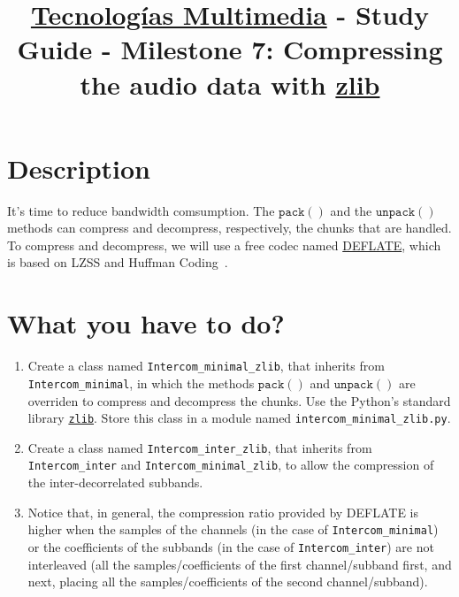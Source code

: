 \title{\href{https://www.ual.es/estudios/grados/presentacion/plandeestudios/asignatura/4015/40154321?idioma=zh_CN}{Tecnologías Multimedia} - Study Guide - Milestone 7: Compressing the audio data with \href{https://zlib.net/}{zlib}}

\maketitle

\section{Description}

It's time to reduce bandwidth comsumption. The $\mathtt{pack()}$ and
the $\mathtt{unpack()}$ methods can compress and decompress,
respectively, the chunks that are handled. To compress and decompress,
we will use a free codec named
\href{https://en.wikipedia.org/wiki/DEFLATE}{DEFLATE}, which is based
on LZSS and Huffman Coding~\cite{nelson96datacompression}.

\section{What you have to do?}

\begin{enumerate}
\item Create a class named \texttt{Intercom\_minimal\_zlib}, that
  inherits from \texttt{Intercom\_minimal}, in which the methods
  $\mathtt{pack()}$ and $\mathtt{unpack()}$ are overriden to compress
  and decompress the chunks. Use the Python's standard library
  \href{https://docs.python.org/3/library/zlib.html}{\texttt{zlib}}. Store
  this class in a module named \texttt{intercom\_minimal\_zlib.py}.
\item Create a class named \texttt{Intercom\_inter\_zlib}, that
  inherits from \texttt{Intercom\_inter} and
  \texttt{Intercom\_minimal\_zlib}, to allow the compression of the
  inter-decorrelated subbands.
\item Notice that, in general, the compression ratio provided by
  DEFLATE is higher when the samples of the channels (in the case of
  \texttt{Intercom\_minimal}) or the coefficients of the subbands (in
  the case of \texttt{Intercom\_inter}) are not interleaved (all the
  samples/coefficients of the first channel/subband first, and next,
  placing all the samples/coefficients of the second channel/subband).
\end{enumerate}

